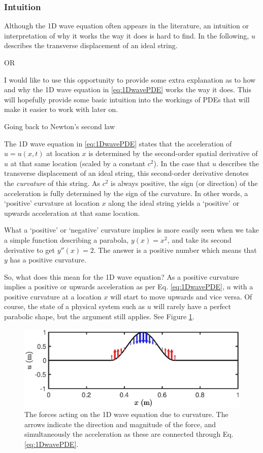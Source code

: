 \subsubsection{Intuition}
Although the 1D wave equation often appears in the literature, an intuition or interpretation of why it works the way it does is hard to find. In the following, $u$ describes the transverse displacement of an ideal string.

OR 

I would like to use this opportunity to provide some extra explanation as to how and why the 1D wave equation in \eqref{eq:1DwavePDE} works the way it does. This will hopefully provide some basic intuition into the workings of PDEs that will make it easier to work with later on. \SWcomment[somethingsomething]

Going back to Newton's second law

The 1D wave equation in \eqref{eq:1DwavePDE} states that the acceleration of $u = u(x,t)$ at location $x$ is determined by the second-order spatial derivative of $u$ at that same location (scaled by a constant $c^2$). In the case that $u$ describes the transverse displacement of an ideal string, this second-order derivative denotes the \textit{curvature} of this string. As $c^2$ is always positive, the sign (or direction) of the acceleration is fully determined by the sign of the curvature. In other words, a `positive' curvature at location $x$ along the ideal string yields a `positive' or upwards acceleration at that same location. 

What a `positive' or `negative' curvature implies is more easily seen when we take a simple function describing a parabola, $y(x) = x^2$, and take its second derivative to get $y''(x) = 2$. The answer is a positive number which means that $y$ has a positive curvature. 

So, what does this mean for the 1D wave equation? As a positive curvature implies a positive or upwards acceleration as per Eq. \eqref{eq:1DwavePDE}, $u$ with a positive curvature at a location $x$ will start to move upwards and vice versa. Of course, the state of a physical system such as $u$ will rarely have a perfect parabolic shape, but the argument still applies. See Figure \ref{fig:curvature}.

\begin{figure}[h]
    \centering
    \includegraphics[width=\textwidth]{figures/resonators/curvature.eps}
    \caption{\label{fig:curvature} The forces acting on the 1D wave equation due to curvature. The arrows indicate the direction and magnitude of the force, and simultaneously the acceleration as these are connected through Eq. \eqref{eq:1DwavePDE}.}
\end{figure}

